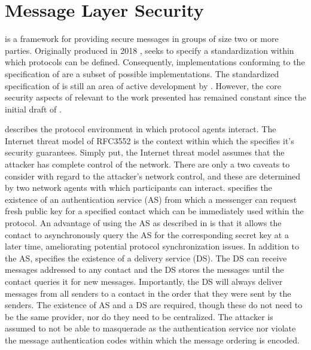 \hypertarget{message-layer-security}{%
\section{Message Layer Security}\label{message-layer-security}}

 \autocite{Omara2020} is a framework for providing secure messages in groups of size two or more parties.
Originally produced in 2018 \autocite{ietf-mls-architecture-02},  seeks to specify a standardization within which  protocols can be defined.
Consequently, implementations conforming to the specification of  are a subset of possible  implementations.
The standardized specification of  is still an area of active development by .
However, the core security aspects of  relevant to the work presented has remained constant since the initial draft of .

 describes the protocol environment in which protocol agents interact.
The Internet threat model of RFC3552 \autocite{rescorla2003rfc3552} is the context within which the  specifies it's security guarantees.
Simply put, the Internet threat model assumes that the attacker has complete control of the network.
There are only a two caveats to consider with regard to the attacker's network control, and these are determined by two network agents with which  participants can interact.
 specifies the existence of an authentication service (AS) from which a messenger can request fresh public key for a specified contact which can be immediately used within the  protocol.
An advantage of using the AS as described in  is that it allows the contact to asynchronously query the AS for the corresponding secret key at a later time, ameliorating potential protocol synchronization issues.
In addition to the AS,  specifies the existence of a delivery service (DS).
The DS can receive messages addressed to any contact and the DS stores the messages until the contact queries it for new messages.
Importantly, the DS will always deliver messages from all senders to a contact in the order that they were sent by the senders.
The existence of AS and a DS are required, though these do not need to be the same provider, nor do they need to be centralized.
The attacker is assumed to not be able to masquerade as the authentication service nor violate the message authentication codes within which the message ordering is encoded.

